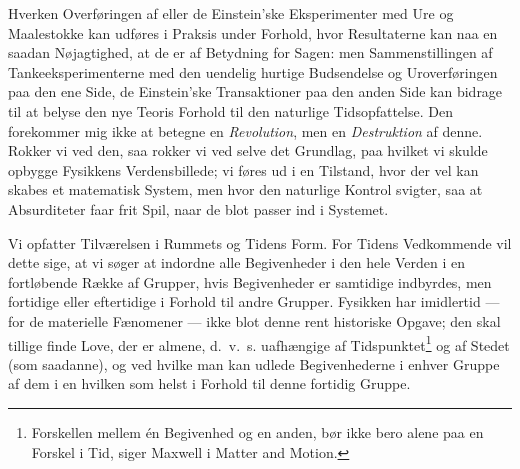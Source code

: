 \documentclass[12pt,a4paper]{article}
\newcommand{\opage}[1]{\marginnote{\footnotesize\textit{[#1]}}}
\begin{document}
Hverken Overføringen af eller de Einstein'ske Eksperimenter med Ure og
Maalestokke kan udføres i Praksis under Forhold, hvor Resultaterne kan naa en
saadan Nøjagtighed, at de er af Betydning for Sagen: men Sammenstillingen af
Tankeeksperimenterne med den uendelig hurtige Budsendelse og Uroverføringen paa
den ene Side, de Einstein'ske Transaktioner paa den anden Side kan bidrage til
at belyse den nye Teoris Forhold til den naturlige Tidsopfattelse. Den
\opage{7} forekommer mig ikke at betegne en \emph{Revolution}, men en
\emph{Destruktion} af denne. Rokker vi ved den, saa rokker vi ved selve det
Grundlag, paa hvilket vi skulde opbygge Fysikkens Verdensbillede; vi føres ud i
en Tilstand, hvor der vel kan skabes et matematisk System, men hvor den
naturlige Kontrol svigter, saa at Absurditeter faar frit Spil, naar de blot
passer ind i Systemet.

Vi opfatter Tilværelsen i Rummets og Tidens Form. For Tidens Vedkommende vil
dette sige, at vi søger at indordne alle Begivenheder i den hele Verden i en
fortløbende Række af Grupper, hvis Begivenheder er samtidige indbyrdes, men
fortidige eller eftertidige i Forhold til andre Grupper. Fysikken har
imidlertid --- for de materielle Fænomener --- ikke blot denne rent historiske
Opgave; den skal tillige finde Love, der er almene, d.~v.~s. uafhængige af
Tidspunktet\footnote{\guillemotleft Forskellen mellem én Begivenhed og en
anden, bør ikke bero alene paa en Forskel i Tid\guillemotright, siger Maxwell i
\guillemotleft Matter and Motion\guillemotright.} og af Stedet (som saadanne),
og ved hvilke man kan udlede Begivenhederne i enhver Gruppe af dem i en hvilken
som helst i Forhold til denne fortidig Gruppe.
\end{document}
